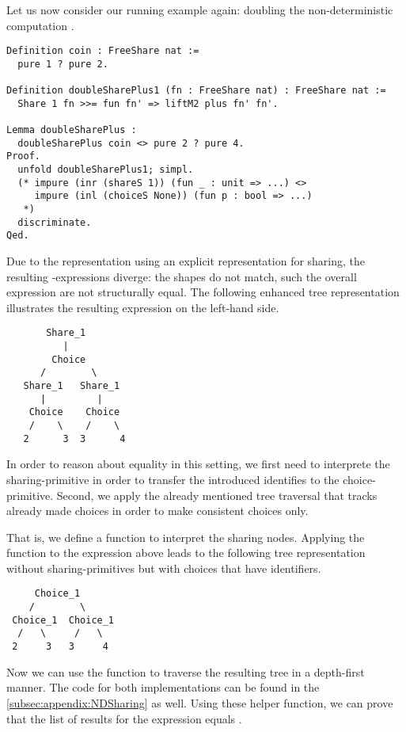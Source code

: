 Let us now consider our running example again: doubling the non-deterministic computation .

\begin{verbatim}
Definition coin : FreeShare nat :=
  pure 1 ? pure 2.

Definition doubleSharePlus1 (fn : FreeShare nat) : FreeShare nat :=
  Share 1 fn >>= fun fn' => liftM2 plus fn' fn'.

Lemma doubleSharePlus :
  doubleSharePlus coin <> pure 2 ? pure 4.
Proof.
  unfold doubleSharePlus1; simpl.
  (* impure (inr (shareS 1)) (fun _ : unit => ...) <>
     impure (inl (choiceS None)) (fun p : bool => ...)
   *)
  discriminate.
Qed.
\end{verbatim}

Due to the representation using an explicit representation for sharing, the resulting -expressions diverge: the shapes do not match, such the overall expression are not structurally equal.
The following enhanced tree representation illustrates the resulting expression on the left-hand side.

\begin{verbatim}
       Share_1
          |      
        Choice
      /        \
   Share_1   Share_1
      |         |
    Choice    Choice
    /    \    /    \
   2      3  3      4
\end{verbatim}

In order to reason about equality in this setting, we first need to interprete the sharing-primitive in order to transfer the introduced identifies to the choice-primitive.
Second, we apply the already mentioned tree traversal that tracks already made choices in order to make consistent choices only.

That is, we define a function \cinl{numberChoices : FreeShareND A -> FreeND A} to interpret the sharing nodes.
Applying the function to the expression above leads to the following tree representation without sharing-primitives but with choices that have identifiers.

\begin{verbatim}
     Choice_1
    /        \
 Choice_1  Choice_1
  /   \     /   \
 2     3   3     4
\end{verbatim}

Now we can use the function  to traverse the resulting tree in a depth-first manner.
The code for both implementations can be found in the \autoref{subsec:appendix:NDSharing} as well.
Using these helper function, we can prove that the list of results for the expression  equals \cinl{[2;4]}.

